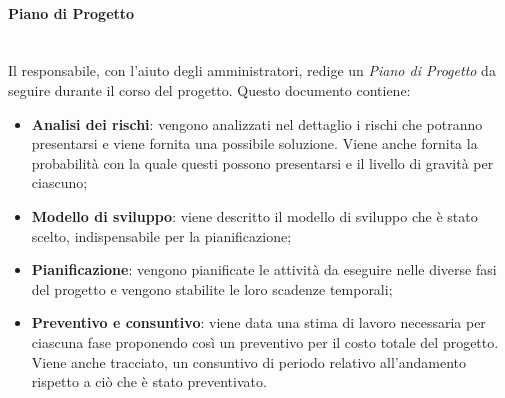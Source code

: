 		\paragraph{Piano di Progetto} \mbox{}\\
		Il responsabile, con l'aiuto degli amministratori, redige un \textit{Piano di Progetto} da seguire durante il corso del progetto. Questo documento contiene:
		\begin{itemize}
			\item \textbf{Analisi dei rischi}: vengono analizzati nel dettaglio i rischi che potranno presentarsi e viene fornita una possibile soluzione. Viene anche fornita la probabilità con la quale questi possono presentarsi e il livello di gravità per ciascuno;
			\item \textbf{Modello di sviluppo}: viene descritto il modello di sviluppo che è stato scelto, indispensabile per la pianificazione;
			\item \textbf{Pianificazione}: vengono pianificate le attività da eseguire nelle diverse fasi del progetto e vengono stabilite le loro scadenze temporali;
			\item \textbf{Preventivo e consuntivo}: viene data una stima di lavoro necessaria per ciascuna fase proponendo così un preventivo per il costo totale del progetto. Viene anche tracciato, un consuntivo di periodo relativo all'andamento rispetto a ciò che è stato preventivato.
		\end{itemize}
